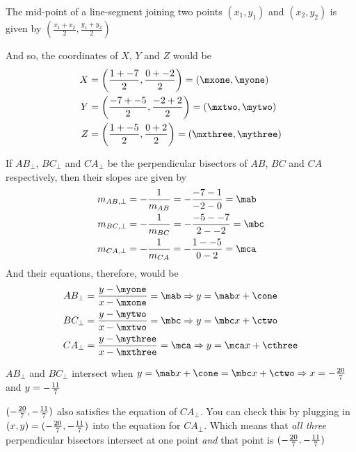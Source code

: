 \watchout

\begin{solution}[\fullpage]
	
		The mid-point of a line-segment joining two points $(x_1, y_1)$ and $(x_2, y_2)$ is given 
		by $\left( \frac{x_1 + x_2}{2}, \frac{y_1 + y_2}{2}\right)$
		
		And so, the coordinates of $X$, $Y$ and $Z$ would be 
		\begin{align}
			X &= \left( \frac{\vbone + \vbthree}{2}, \frac{\vbtwo + \vbfour}{2} \right) = (\mxone, \myone) \\
			Y &= \left( \frac{\vbthree + \vbfive}{2}, \frac{\vbfour + \vbsix}{2} \right) = (\mxtwo, \mytwo) \\
			Z &= \left( \frac{\vbone + \vbfive}{2}, \frac{\vbtwo + \vbsix}{2} \right) = (\mxthree, \mythree)
		\end{align}
	
		If $AB_\perp$, $BC_\perp$ and $CA_\perp$ be the perpendicular bisectors of $AB$, $BC$ and $CA$ respectively, then 
		their slopes are given by
		\begin{align}
			m_{AB,\perp} &= -\frac{1}{m_{AB}} = -\dfrac{\vbthree - \vbone}{\vbfour - \vbtwo} = \mab \\
			m_{BC,\perp} &= -\frac{1}{m_{BC}} = -\dfrac{\vbfive - \vbthree}{\vbsix - \vbfour} = \mbc \\
			m_{CA,\perp} &= -\frac{1}{m_{CA}} = -\dfrac{\vbone - \vbfive}{\vbtwo - \vbsix} = \mca
		\end{align}
		And their equations, therefore, would be 
		\begin{align}
			AB_\perp &= \dfrac{y-\myone}{x-\mxone} = \mab \Rightarrow y = \mab x + \cone \\
			BC_\perp &= \dfrac{y-\mytwo}{x-\mxtwo} = \mbc \Rightarrow y = \mbc x + \ctwo \\
			CA_\perp &= \dfrac{y-\mythree}{x-\mxthree} = \mca \Rightarrow y = \mca x + \cthree					
		\end{align}
	
		$AB_\perp$ and $BC_\perp$ intersect when $ y = \mab x + \cone = \mbc x + \ctwo \Rightarrow x = \vbseven$ 
		and $y = -\frac{11}{7}$
		
		$(-\frac{20}{7}, -\frac{11}{7})$ also satisfies the equation of $CA_\perp$. You can check this by plugging in 
		$(x,y) = (-\frac{20}{7}, -\frac{11}{7})$ into the equation for $CA_\perp$. Which means that \textit{all three} 
		perpendicular bisectors intersect at one point \textit{and} that point is $(-\frac{20}{7}, -\frac{11}{7})$
\end{solution}


